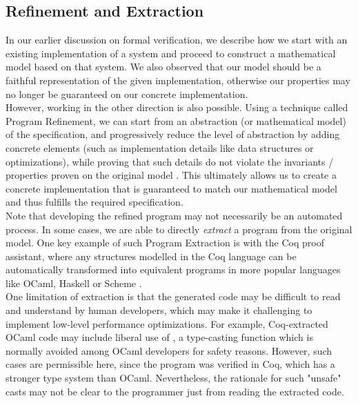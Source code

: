\subsection{Refinement and Extraction}
In our earlier discussion on formal verification, we describe how we start with an existing implementation of a system and proceed to construct a mathematical model based on that system. We also observed that our model should be a faithful representation of the given implementation, otherwise our properties may no longer be guaranteed on our concrete implementation.
\\

However, working in the other direction is also possible. Using a technique called Program Refinement, we can start from an abstraction (or mathematical model) of the specification, and progressively reduce the level of abstraction by adding concrete elements (such as implementation details like data structures or optimizations), while proving that such details do not violate the invariants / properties proven on the original model \cite{refinement}. This ultimately allows us to create a concrete implementation that is guaranteed to match our mathematical model and thus fulfills the required specification.
\\

Note that developing the refined program may not necessarily be an automated process. In some cases, we are able to directly \textit{extract} a program from the original model. One key example of such Program Extraction is with the Coq proof assistant, where any structures modelled in the Coq language can be automatically transformed into equivalent programs in more popular languages like OCaml, Haskell or Scheme \cite{extraction}.
\\

One limitation of extraction is that the generated code may be difficult to read and understand by human developers, which may make it challenging to implement low-level performance optimizations. For example, Coq-extracted OCaml code may include liberal use of , a type-casting function which is normally avoided among OCaml developers for safety reasons. However, such cases are permissible here, since the program was verified in Coq, which has a stronger type system than OCaml. Nevertheless, the rationale for such "unsafe" casts may not be clear to the programmer just from reading the extracted code.

~\\

